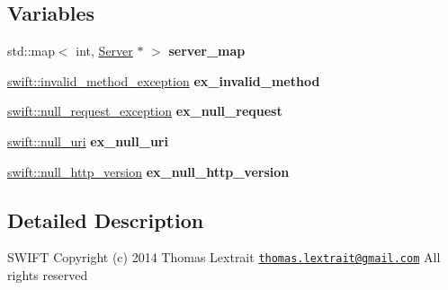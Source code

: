 \subsection*{Variables}
\begin{DoxyCompactItemize}
\item 
\hypertarget{namespaceswift_a0d54eeac3847161ee8afa83619ab7cc2}{std\-::map$<$ int, \hyperlink{classswift_1_1_server}{Server} $\ast$ $>$ {\bfseries server\-\_\-map}}\label{namespaceswift_a0d54eeac3847161ee8afa83619ab7cc2}

\item 
\hypertarget{namespaceswift_a96185be7719182de92b20647b128052b}{\hyperlink{classswift_1_1invalid__method__exception}{swift\-::invalid\-\_\-method\-\_\-exception} {\bfseries ex\-\_\-invalid\-\_\-method}}\label{namespaceswift_a96185be7719182de92b20647b128052b}

\item 
\hypertarget{namespaceswift_a67a56ddf2be450e8dc22dfd52ebea928}{\hyperlink{classswift_1_1null__request__exception}{swift\-::null\-\_\-request\-\_\-exception} {\bfseries ex\-\_\-null\-\_\-request}}\label{namespaceswift_a67a56ddf2be450e8dc22dfd52ebea928}

\item 
\hypertarget{namespaceswift_a756e24577ff3a64bf666dcde7d69948c}{\hyperlink{classswift_1_1null__uri}{swift\-::null\-\_\-uri} {\bfseries ex\-\_\-null\-\_\-uri}}\label{namespaceswift_a756e24577ff3a64bf666dcde7d69948c}

\item 
\hypertarget{namespaceswift_a436035781ad4624a65099c0f8634813b}{\hyperlink{classswift_1_1null__http__version}{swift\-::null\-\_\-http\-\_\-version} {\bfseries ex\-\_\-null\-\_\-http\-\_\-version}}\label{namespaceswift_a436035781ad4624a65099c0f8634813b}

\end{DoxyCompactItemize}


\subsection{Detailed Description}
S\-W\-I\-F\-T Copyright (c) 2014 Thomas Lextrait \href{mailto:thomas.lextrait@gmail.com}{\tt thomas.\-lextrait@gmail.\-com} All rights reserved 

